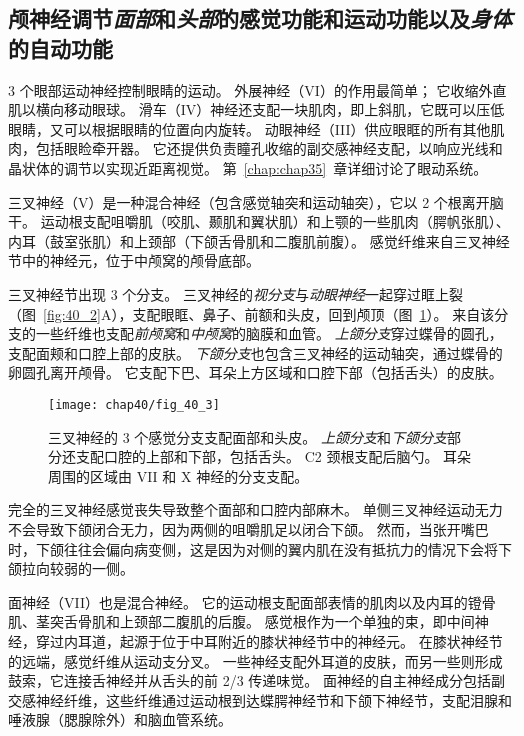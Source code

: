 \subsection{颅神经调节\textit{面部}和\textit{头部}的感觉功能和运动功能以及\textit{身体}的自动功能}

3 个眼部运动神经控制眼睛的运动。
外展神经（VI）的作用最简单；
它收缩外直肌以横向移动眼球。
滑车（IV）神经还支配一块肌肉，即上斜肌，它既可以压低眼睛，又可以根据眼睛的位置向内旋转。
动眼神经（III）供应眼眶的所有其他肌肉，包括眼睑牵开器。
它还提供负责瞳孔收缩的副交感神经支配，以响应光线和晶状体的调节以实现近距离视觉。
第~\ref{chap:chap35}~章详细讨论了眼动系统。


三叉神经（V）是一种混合神经（包含感觉轴突和运动轴突），它以 2 个根离开脑干。
运动根支配咀嚼肌（咬肌、颞肌和翼状肌）和上颚的一些肌肉（腭帆张肌）、内耳（鼓室张肌）和上颈部（下颌舌骨肌和二腹肌前腹）。
感觉纤维来自三叉神经节中的神经元，位于中颅窝的颅骨底部。


三叉神经节出现 3 个分支。
三叉神经的\textit{视分支}与\textit{动眼神经}一起穿过眶上裂（图~\ref{fig:40_2}A），支配眼眶、鼻子、前额和头皮，回到颅顶（图~\ref{fig:40_3}）。
来自该分支的一些纤维也支配\textit{前颅窝}和\textit{中颅窝}的脑膜和血管。
\textit{上颌分支}穿过蝶骨的圆孔，支配面颊和口腔上部的皮肤。
\textit{下颌分支}也包含三叉神经的运动轴突，通过蝶骨的卵圆孔离开颅骨。
它支配下巴、耳朵上方区域和口腔下部（包括舌头）的皮肤。


\begin{figure}[htbp]
	\centering
	\texttt{[image: chap40/fig\_40\_3]}
	\caption{三叉神经的 3 个感觉分支支配面部和头皮。
		\textit{上颌分支}和\textit{下颌分支}部分还支配口腔的上部和下部，包括舌头。
		C2 颈根支配后脑勺。
		耳朵周围的区域由 VII 和 X 神经的分支支配。}
	\label{fig:40_3}
\end{figure}


完全的三叉神经感觉丧失导致整个面部和口腔内部麻木。
单侧三叉神经运动无力不会导致下颌闭合无力，因为两侧的咀嚼肌足以闭合下颌。
然而，当张开嘴巴时，下颌往往会偏向病变侧，这是因为对侧的翼内肌在没有抵抗力的情况下会将下颌拉向较弱的一侧。


面神经（VII）也是混合神经。
它的运动根支配面部表情的肌肉以及内耳的镫骨肌、茎突舌骨肌和上颈部二腹肌的后腹。
感觉根作为一个单独的束，即中间神经，穿过内耳道，起源于位于中耳附近的膝状神经节中的神经元。
在膝状神经节的远端，感觉纤维从运动支分叉。
一些神经支配外耳道的皮肤，而另一些则形成鼓索，它连接舌神经并从舌头的前 2/3 传递味觉。
面神经的自主神经成分包括副交感神经纤维，这些纤维通过运动根到达蝶腭神经节和下颌下神经节，支配泪腺和唾液腺（腮腺除外）和脑血管系统。


